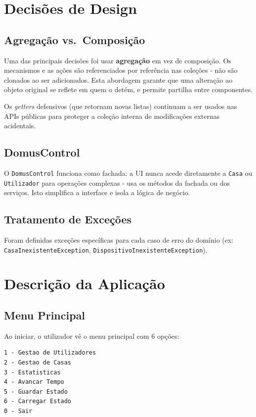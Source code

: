\documentclass[a4paper]{article}
\begin{document}
\section{Decisões de Design}

\subsection{Agregação vs.\ Composição}

Uma das principais decisões foi usar \textbf{agregação} em vez de composição. Os mecanismos e as ações são referenciados por referência nas coleções - não são clonados ao ser adicionados. Esta abordagem garante que uma alteração ao objeto original se reflete em quem o detém, e permite partilha entre componentes.

Os \textit{getters} defensivos (que retornam novas listas) continuam a ser usados nas APIs públicas para proteger a coleção interna de modificações externas acidentais.

\subsection{DomusControl}

O \texttt{DomusControl} funciona como fachada: a UI nunca acede diretamente a \texttt{Casa} ou \texttt{Utilizador} para operações complexas - usa os métodos da fachada ou dos serviços. Isto simplifica a interface e isola a lógica de negócio.


\subsection{Tratamento de Exceções}

Foram definidas exceções específicas para cada caso de erro do domínio (ex: \texttt{CasaInexistenteException}, \texttt{DispositivoInexistenteException}). 

\section{Descrição da Aplicação}

\subsection{Menu Principal}

Ao iniciar, o utilizador vê o menu principal com 6 opções:

\vspace{0.15cm}
\begin{lstlisting}[language={}, frame=single, numbers=none]
1 - Gestao de Utilizadores
2 - Gestao de Casas
3 - Estatisticas
4 - Avancar Tempo
5 - Guardar Estado
6 - Carregar Estado
0 - Sair
\end{lstlisting}
\vspace{0.15cm}
\end{document}
